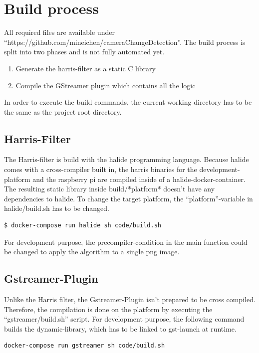 \section{Build process}
All required files are available under \enquote{https://github.com/mineichen/cameraChangeDetection}. The build process is split into two phases and is not fully automated yet.
 
\begin{enumerate}
	\item{ Generate the harris-filter as a static C library}
	\item{ Compile the GStreamer plugin which contains all the logic}
\end{enumerate}

In order to execute the build commands, the current working directory has to be the same as the project root directory.

\subsection{Harris-Filter}
The Harris-filter is build with the halide programming language. Because halide comes with a cross-compiler built in, the harris binaries for the development-platform and the raspberry pi are compiled inside of a halide-docker-container. The resulting static library inside build/*platform* doesn't have any dependencies to halide. To change the target platform, the \enquote{platform}-variable in halide/build.sh has to be changed.

\begin{lstlisting}[language=bash]
$ docker-compose run halide sh code/build.sh
\end{lstlisting}

For development purpose, the precompiler-condition in the main function could be changed to apply the algorithm to a single png image. 

\subsection{Gstreamer-Plugin}
Unlike the Harris filter, the Gstreamer-Plugin isn't prepared to be cross compiled. Therefore, the compilation is done on the platform by executing the \enquote{gstreamer/build.sh} script. For development purpose, the following command builds the dynamic-library, which has to be linked to gst-launch at runtime.

\begin{lstlisting}[language=bash]
docker-compose run gstreamer sh code/build.sh
\end{lstlisting}

